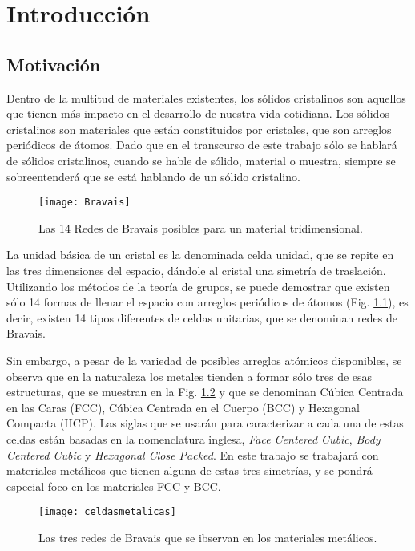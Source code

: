 \chapter{Introducción}
\graphicspath{{./figs/01_intro/}}
\section{Motivación}\label{S:motivacion}
Dentro de la multitud de materiales existentes, los sólidos cristalinos son aquellos que tienen más impacto en el desarrollo de nuestra vida cotidiana. 
Los sólidos cristalinos son materiales que están constituidos por cristales, que son arreglos periódicos de átomos. 
Dado que en el transcurso de este trabajo sólo se hablará de sólidos cristalinos, cuando se hable de sólido, material o muestra, siempre se sobreentenderá que se está hablando de un sólido cristalino.

\begin{figure}[h!]
  \centering
  \texttt{[image: Bravais]}
  \caption{Las 14 Redes de Bravais posibles para un material tridimensional.}
  \label{fig:Bravais}
\end{figure}

La unidad básica de un cristal es la denominada celda unidad, que se repite en las tres dimensiones del espacio, dándole al cristal una simetría de traslación. Utilizando los métodos de la teoría de grupos, se puede demostrar que existen sólo 14 formas de llenar el espacio con arreglos periódicos de átomos (Fig. \ref{fig:Bravais}), es decir, existen 14 tipos diferentes de celdas unitarias, que se denominan redes de Bravais\cite{hahn2005international}.

Sin embargo, a pesar de la variedad de posibles arreglos atómicos disponibles, se observa que en la naturaleza los metales tienden a formar sólo tres de esas estructuras, que se muestran en la Fig. \ref{fig:celdasmetalicas} y que se denominan Cúbica Centrada en las Caras (FCC), Cúbica Centrada en el Cuerpo (BCC) y Hexagonal Compacta (HCP). 
Las siglas que se usarán para caracterizar a cada una de estas celdas están basadas en la nomenclatura inglesa, \textit{Face Centered Cubic}, \textit{Body Centered Cubic} y \textit{Hexagonal Close Packed}. En este trabajo se trabajará con materiales metálicos que tienen alguna de estas tres simetrías, y se pondrá especial foco en los materiales FCC y BCC.

\begin{figure}[h!]
  \centering
  \texttt{[image: celdasmetalicas]}
  \caption{Las tres redes de Bravais que se ibservan en los materiales metálicos.}
  \label{fig:celdasmetalicas}
\end{figure} 

